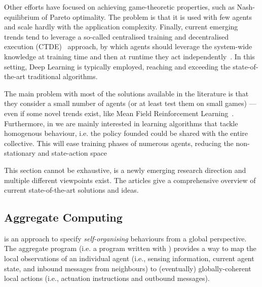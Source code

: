 \documentclass[11pt]{article}
\begin{document}
Other efforts have focused on achieving game-theoretic properties, such as Nash-equilibrium of Pareto optimality.
The problem is that it is used with few agents and scale hardly with the application complexity.
%
Finally, current emerging trends tend to leverage a so-called centralised training and decentralised execution (CTDE)~\cite{DBLP:journals/tcyb/NguyenNN20} approach, by which 
 agents should leverage the system-wide knowledge at training time and then at runtime they act independently~\cite{DBLP:journals/aamas/Hernandez-LealK19}. In this setting, Deep Learning is typically employed, reaching and exceeding the state-of-the-art traditional \marl{} algorithms.
 
The main problem with most of the solutions available in the literature is that they consider a small number of agents (or at least test them on small games) --- even if some novel trends exist, like Mean Field Reinforcement Learning~\cite{DBLP:journals/corr/abs-2108-02731}.
Furthermore, in \cpsw{} we are mainly interested in learning algorithms that tackle homogenous behaviour, i.e. the policy founded could be shared with the entire collective. This will ease training phases of numerous agents, reducing the non-stationary and state-action space

This section cannot be exhaustive, \marl{} is a newly emerging research direction and multiple different viewpoints exist. The articles \cite{DBLP:journals/aamas/Hernandez-LealK19, DBLP:journals/corr/abs-1911-10635, DBLP:journals/corr/abs-1908-03963} give a comprehensive overview of current state-of-the-art solutions and ideas.
\subsection{Aggregate Computing}

\ac{} is an approach to specify \emph{self-organising} behaviours from a global perspective.
%
The aggregate program (i.e. a program written with \ac{}) provides a way to map the local observations of an individual agent (i.e., sensing information, current agent state, and inbound messages from neighbours) to (eventually) globally-coherent local actions
 (i.e., actuation instructions and outbound messages).
%
\end{document}
